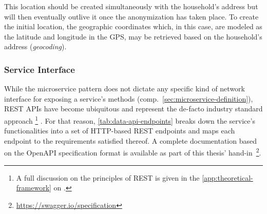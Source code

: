 This location should be created simultaneously with the household's address but will then eventually outlive it once the anonymization has taken place. To create the initial location, the geographic coordinates which, in this case, are modeled as the latitude and longitude in the \ac{GPS}, may be retrieved based on the household's address (\textit{geocoding}).


\subsubsection{Service Interface}
\label{sec:data-api-service-interface}

While the microservice pattern does not dictate any specific kind of network interface for exposing a service's methods (comp.~\autoref{sec:microservice-definition}), \acs{REST} \acsp{API} have become ubiquitous and represent the de-facto industry standard approach \footnote{A full discussion on the principles of \acs{REST} is given in the \autoref{app:theoretical-framework} on .} \cite[p.~3]{rapidapi2020}. For that reason, \autoref{tab:data-api-endpoints} breaks down the service's functionalities into a set of \acs{HTTP}-based \acs{REST} endpoints and maps each endpoint to the requirements satisfied thereof. A complete documentation based on the OpenAPI specification format is available as part of this thesis' hand-in~\footnote{\url{https://swagger.io/specification}}.

